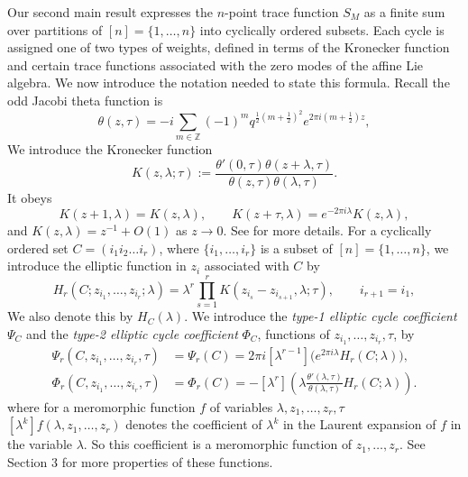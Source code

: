 \documentclass[11pt,a4paper]{amsart}
\numberwithin{equation}{section}
\theoremstyle{definition}
\theoremstyle{remark}
\newcommand{\ZZ}{\mathbb Z}
\newcommand{\ii}{i}
\newcommand{\e}{e}
\begin{document}
Our second main result expresses the $n$-point trace function $S_M$  as a finite sum over partitions of $ [ n ]= \{1,\ldots,n\}$ into cyclically ordered subsets. Each cycle is assigned one of two types of weights, defined in terms of the Kronecker function and certain trace functions associated with the zero modes of the affine Lie algebra. We now introduce the notation needed to state this formula.
Recall the odd Jacobi theta function is
\begin{equation}
\theta(z,\tau)=-\ii\sum_{m\in\ZZ}(-1)^m
q^{\frac12(m+\frac12)^2}\e^{2\pi\ii(m+\frac12)z},
\label{eq:odd-theta-intro}
\end{equation}
We introduce the Kronecker function
\begin{equation}
K(z,\lambda;\tau)
:=\frac{\theta'(0,\tau)\theta(z+\lambda,\tau)}
{\theta(z,\tau)\theta(\lambda,\tau)}.
\label{eq:Kronecker-intro}
\end{equation}
It obeys
\begin{equation}
K(z+1,\lambda)=K(z,\lambda),\qquad
K(z+\tau,\lambda)=\e^{-2\pi\ii\lambda}K(z,\lambda),
\label{eq:Kronecker-periods-intro}
\end{equation}
and $K(z,\lambda)=z^{-1}+O(1)$ as $z\to0$.  See \cite{Fay} for more details.
For a cyclically ordered set $ C = ( i_1 i_2 \dots i_r)$, where $\{ i_1 , \dots , i_r \}$ is a subset of $ [n]= \{ 1 , \dots , n \}$, we introduce the elliptic function in $z_i$ associated with $C$ 
 by  
\begin{equation*}
H_r ( C; z_{i_1} , \dots , z_{i_r} ; \lambda  ) =\lambda^r\prod_{s=1}^r
K(z_{i_s}-z_{i_{s+1}},\lambda;\tau),
\qquad i_{r+1}=i_1,
\end{equation*}
We also denote this by  $H_C ( \lambda ) $. 
We introduce the \emph{type-1 elliptic cycle coefficient} $\Psi_C$ and the \emph{type-2 elliptic cycle coefficient} $\Phi_C$, functions of
$z_{i_1},\ldots,z_{i_r},\tau$, by
\begin{align}
\Psi_r (C , z_{i_1} , \dots , z_{i_r} , \tau )  &= \Psi_r(C ) 
=2\pi\ii[\lambda^{r-1}]
\bigl(\e^{2\pi\ii\lambda}H_r(C;\lambda)\bigr), \label{1.10}\\
\Phi_r(C, z_{i_1} , \dots , z_{i_r} , \tau )&=\Phi_r(C) = -[\lambda^r]\left(
\lambda\frac{\theta'(\lambda,\tau)}{\theta(\lambda,\tau)}
H_r(C;\lambda)\right). \label{1.11}
\end{align}
where for a meromorphic function $f$ of variables $\lambda , z_1 , \dots , z_r, \tau $ 
$ [ \lambda^k ] f ( \lambda , z_{1} , \dots , z_{r})$
denotes the coefficient of $ \lambda^k $ in the Laurent expansion of $f$ in the variable $\lambda $. So this coefficient is a meromorphic function of $z_1 , \dots , z_r $.  See Section 3 for more properties of these functions. 
\end{document}
